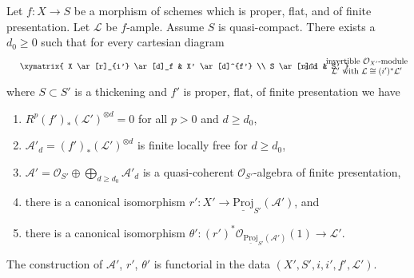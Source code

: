 \begin{lemma}
\label{lemma-deform-projective}
Let $f : X \to S$ be a morphism of schemes which is proper, flat, and
of finite presentation. Let $\mathcal{L}$ be $f$-ample. Assume
$S$ is quasi-compact. There exists a $d_0 \geq 0$ such that
for every cartesian diagram
$$
\vcenter{
\xymatrix{
X \ar[r]_{i'} \ar[d]_f & X' \ar[d]^{f'} \\
S \ar[r]^i & S'
}
}
\quad\text{and}\quad
\begin{matrix}
\text{invertible }\mathcal{O}_{X'}\text{-module}\\
\mathcal{L}'\text{ with }\mathcal{L} \cong (i')^*\mathcal{L}'
\end{matrix}
$$
where $S \subset S'$ is a thickening and $f'$ is
proper, flat, of finite presentation we have
\begin{enumerate}
\item $R^p(f')_*(\mathcal{L}')^{\otimes d} = 0$
for all $p > 0$ and $d \geq d_0$,
\item $\mathcal{A}'_d = (f')_*(\mathcal{L}')^{\otimes d}$
is finite locally free for $d \geq d_0$,
\item $\mathcal{A}' =
\mathcal{O}_{S'} \oplus \bigoplus_{d \geq d_0} \mathcal{A}'_d$
is a quasi-coherent $\mathcal{O}_{S'}$-algebra of finite presentation,
\item there is a canonical isomorphism
$r' : X' \to \underline{\text{Proj}}_{S'}(\mathcal{A}')$, and
\item there is a canonical isomorphism
$\theta' : (r')^*\mathcal{O}_{\underline{\text{Proj}}_{S'}(\mathcal{A}')}(1)
\to \mathcal{L}'$.
\end{enumerate}
The construction of $\mathcal{A}'$, $r'$, $\theta'$
is functorial in the data $(X', S', i, i', f', \mathcal{L}')$.
\end{lemma}

